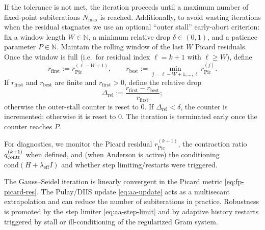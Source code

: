 If the tolerance is not met, the iteration proceeds until a maximum number of fixed-point subiterations $N_{\max}$ is reached. Additionally, to avoid wasting iterations when the residual stagnates we use an optional ``outer stall'' early-abort criterion: fix a window length $W\in\mathbb{N}$, a minimum relative drop $\delta\in(0,1)$, and a patience parameter $P\in\mathbb{N}$. Maintain the rolling window of the last $W$ Picard residuals. Once the window is full (i.e.\ for residual index $\ell=k+1$ with $\ell\ge W$), define
\[
r_{\mathrm{first}} := r_{\mathrm{Pic}}^{(\ell-W+1)},\qquad
r_{\mathrm{best}} := \min_{j=\ell-W+1,\dots,\ell} r_{\mathrm{Pic}}^{(j)}.
\]
If $r_{\mathrm{first}}$ and $r_{\mathrm{best}}$ are finite and $r_{\mathrm{first}}>0$, define the relative drop
\[
\Delta_{\mathrm{rel}} := \frac{r_{\mathrm{first}}-r_{\mathrm{best}}}{r_{\mathrm{first}}};
\]
otherwise the outer-stall counter is reset to $0$. If $\Delta_{\mathrm{rel}}<\delta$, the counter is incremented; otherwise it is reset to $0$. The iteration is terminated early once the counter reaches $P$.

For diagnostics, we monitor the Picard residual $r_{\mathrm{Pic}}^{(k+1)}$, the contraction ratio $q_{\mathrm{contr}}^{(k+1)}$ when defined, and (when Anderson is active) the conditioning $\mathrm{cond}(H+\lambda_{\mathrm{eff}}I)$ and whether step limiting/restarts were triggered.

The Gauss--Seidel iteration is linearly convergent in the Picard metric \eqref{eq:fp-picard-res}. The Pulay/DIIS update \eqref{eq:aa-update} acts as a multisecant extrapolation and can reduce the number of subiterations in practice. Robustness is promoted by the step limiter \eqref{eq:aa-step-limit} and by adaptive history restarts triggered by stall or ill-conditioning of the regularized Gram system.


